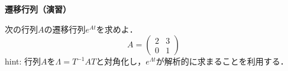 




\exheader

\noindent
{\bf 遷移行列（演習）} \nopagebreak

次の行列$A$の遷移行列$e^{At}$を求めよ．
\[
	A= \left(\begin{array}{cc}
		2 & 3 \\
		0 & 1
	   \end{array} \right )
\]
hint: 行列$A$を$\Lambda = T^{-1}AT$と対角化し，$e^{\Lambda t}$が解析的に求まることを利用する．


\newpage

%
%
%

